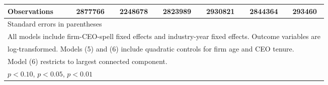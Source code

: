 \begin{table}[htbp]
\begin{tabular}{l*{6}{c}}
\midrule
Observations        &     2877766         &     2248678         &     2823989         &     2930821         &     2844364         &      293460         \\
\bottomrule
\multicolumn{7}{l}{\footnotesize Standard errors in parentheses}\\
\multicolumn{7}{l}{\footnotesize All models include firm-CEO-spell fixed effects and industry-year fixed effects. Outcome variables are}\\
\multicolumn{7}{l}{\footnotesize log-transformed. Models (5) and (6) include quadratic controls for firm age and CEO tenure.}\\
\multicolumn{7}{l}{\footnotesize Model (6) restricts to largest connected component.}\\
\multicolumn{7}{l}{\footnotesize \sym{*} \(p<0.10\), \sym{**} \(p<0.05\), \sym{***} \(p<0.01\)}\\
\end{tabular}
\end{table}
